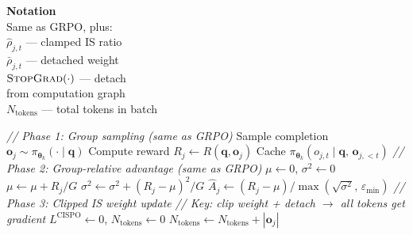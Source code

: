\documentclass[11pt]{article}
\begin{document}
\begin{algorithm}[p]
\begin{minipage}[t]{0.28\linewidth}
\vspace{6pt}
\textbf{Notation} \\[2pt]
Same as GRPO, plus: \\
$\hat{\rho}_{j,t}$ — clamped IS ratio \\
$\bar{\rho}_{j,t}$ — detached weight \\
$\textsc{StopGrad}(\cdot)$ — detach \\
\hspace*{1em}from computation graph \\
$N_{\text{tokens}}$ — total tokens in batch
\end{minipage}%
\hfill
\vrule
\hfill
\begin{minipage}[t]{0.68\linewidth}
\begin{algorithmic}[1]
    \Statex \hspace{\algorithmicindent}\textit{// Phase 1: Group sampling (same as GRPO)}
            \State Sample completion $\mathbf{o}_j \sim \pi_{\boldsymbol{\theta}_k}(\cdot \mid \mathbf{q})$
            \State Compute reward $R_j \gets R(\mathbf{q}, \mathbf{o}_j)$
                \State Cache $\pi_{\boldsymbol{\theta}_k}(o_{j,t} \mid \mathbf{q},\, \mathbf{o}_{j,<t})$
            \EndFor
        \EndFor
    \EndFor
    \Statex \hspace{\algorithmicindent}\textit{// Phase 2: Group-relative advantage (same as GRPO)}
        \State $\mu \gets 0$, \; $\sigma^2 \gets 0$
            \State $\mu \gets \mu + R_j / G$
        \EndFor
            \State $\sigma^2 \gets \sigma^2 + (R_j - \mu)^2 / G$
        \EndFor
            \State $\hat{A}_j \gets (R_j - \mu) / \max(\sqrt{\sigma^2},\, \varepsilon_{\min})$
        \EndFor
    \EndFor
    \Statex \hspace{\algorithmicindent}\textit{// Phase 3: Clipped IS weight update}
    \Statex \hspace{\algorithmicindent}\textit{// Key: clip weight + detach $\rightarrow$ all tokens get gradient}
            \State $L^{\text{CISPO}} \gets 0$, \; $N_{\text{tokens}} \gets 0$
                \State $N_{\text{tokens}} \gets N_{\text{tokens}} + |\mathbf{o}_j|$

\end{algorithmic}
\end{minipage}
\end{algorithm}
\end{document}
